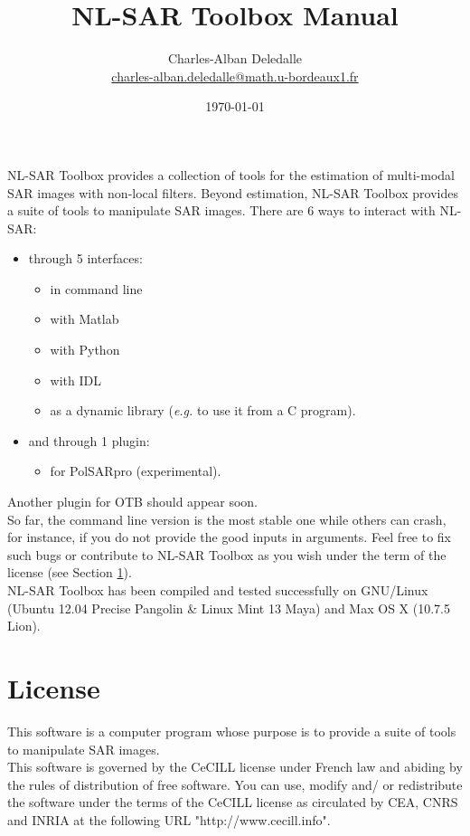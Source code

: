 \documentclass[10pt,french,english,a4paper]{article}
\title{%
  NL-SAR Toolbox Manual
}
\author{
  Charles-Alban Deledalle\\
  \url{charles-alban.deledalle@math.u-bordeaux1.fr}
}
\date{\today}
\begin{document}
\sloppy

\maketitle

NL-SAR Toolbox provides a collection of tools for the estimation of
multi-modal SAR images with non-local filters. Beyond estimation,
NL-SAR Toolbox provides a suite of tools to manipulate SAR images.
There are 6 ways to interact with NL-SAR:
\begin{itemize}
\item through 5 interfaces:
\begin{itemize}
\item in command line
\item with Matlab
\item with Python
\item with IDL
\item as a dynamic library ({\it e.g.} to use it from a C program).
\end{itemize}
\item and through 1 plugin:
\begin{itemize}
\item for PolSARpro (experimental).
\end{itemize}
\end{itemize}

Another plugin for OTB should appear soon.\\

So far, the command line version is the most stable one while others can crash,
for instance, if you do not provide the good inputs in arguments. Feel free to fix
such bugs or contribute to NL-SAR Toolbox as you wish under the term of the license
(see Section \ref{sec:license}).\\

NL-SAR Toolbox has been compiled and tested successfully on
GNU/Linux (Ubuntu 12.04 Precise Pangolin \& Linux Mint 13 Maya) and Max OS X (10.7.5 Lion).

\tableofcontents

\section{License}
\label{sec:license}

This software is a computer program whose purpose is to provide a
suite of tools to manipulate SAR images.\\

This software is governed by the CeCILL license under French law and
abiding by the rules of distribution of free software. You can use,
modify and/ or redistribute the software under the terms of the CeCILL
license as circulated by CEA, CNRS and INRIA at the following URL
"http://www.cecill.info".\\
\end{document}
